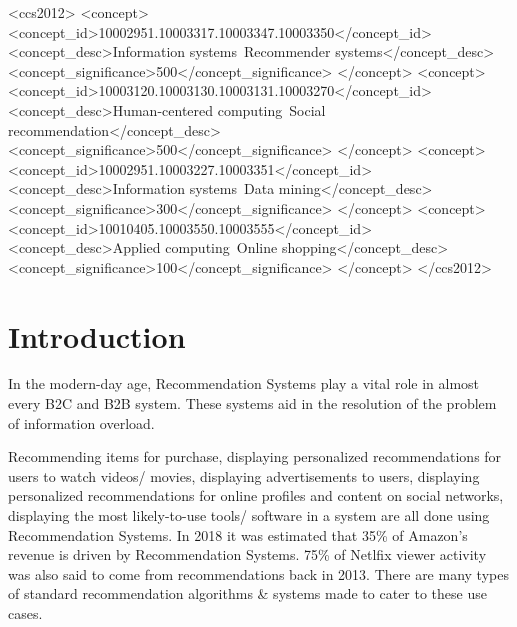 \documentclass[manuscript,screen,review]{acmart}
\begin{document}
\begin{CCSXML}
<ccs2012>
<concept>
<concept_id>10002951.10003317.10003347.10003350</concept_id>
<concept_desc>Information systems~Recommender systems</concept_desc>
<concept_significance>500</concept_significance>
</concept>
<concept>
<concept_id>10003120.10003130.10003131.10003270</concept_id>
<concept_desc>Human-centered computing~Social recommendation</concept_desc>
<concept_significance>500</concept_significance>
</concept>
<concept>
<concept_id>10002951.10003227.10003351</concept_id>
<concept_desc>Information systems~Data mining</concept_desc>
<concept_significance>300</concept_significance>
</concept>
<concept>
<concept_id>10010405.10003550.10003555</concept_id>
<concept_desc>Applied computing~Online shopping</concept_desc>
<concept_significance>100</concept_significance>
</concept>
</ccs2012>
\end{CCSXML}




\maketitle

\section{Introduction}
In the modern-day age, Recommendation Systems play a vital role in almost every B2C and B2B system. These systems aid in the resolution of the problem of information overload.

Recommending items for purchase, displaying personalized recommendations for users to watch videos/ movies, displaying advertisements to users, displaying personalized recommendations for online profiles and content on social networks, displaying the most likely-to-use tools/ software in a system are all done using Recommendation Systems. In 2018 it was estimated that 35\% of Amazon's revenue \cite{naumov_deep_2019} is driven by Recommendation Systems. 75\% of Netlfix viewer activity \cite{vanderbilt_science_nodate} was also said to come from recommendations back in 2013. There are many types of standard recommendation algorithms \& systems made to cater to these use cases. 
\end{document}
